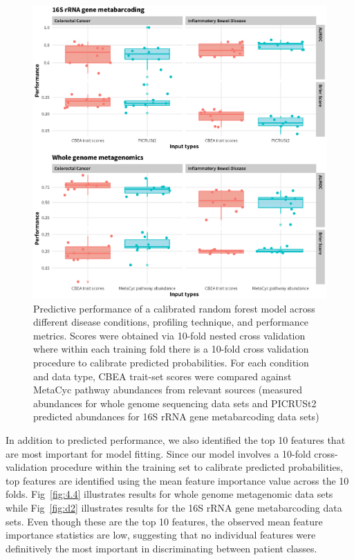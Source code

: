 \begin{figure}[!h]
\includegraphics[width=0.99\linewidth]{figures/ch4_f3.eps}
\caption[Predictive performance of a calibrated random forest model across different disease conditions, profiling technique, and performance metrics]{Predictive performance of a calibrated random forest model across different disease conditions, profiling technique, and performance metrics. Scores were obtained via 10-fold nested cross validation where within each training fold there is a 10-fold cross validation procedure to calibrate predicted probabilities. For each condition and data type, CBEA trait-set scores were compared against MetaCyc pathway abundances from relevant sources (measured abundances for whole genome sequencing data sets and PICRUSt2 predicted abundances for 16S rRNA gene metabarcoding data sets)}
\label{fig:4.3}
\end{figure}

In addition to predicted performance, we also identified the top 10 features that are most important for model fitting. Since our model involves a 10-fold cross-validation procedure within the training set to calibrate predicted probabilities, top features are identified using the mean feature importance value across the 10 folds. Fig~\ref{fig:4.4} illustrates results for whole genome metagenomic data sets while Fig~\ref{fig:d2} illustrates results for the 16S rRNA gene metabarcoding data sets. Even though these are the top 10 features, the observed mean feature importance statistics are low, suggesting that no individual features were definitively the most important in discriminating between patient classes.  


